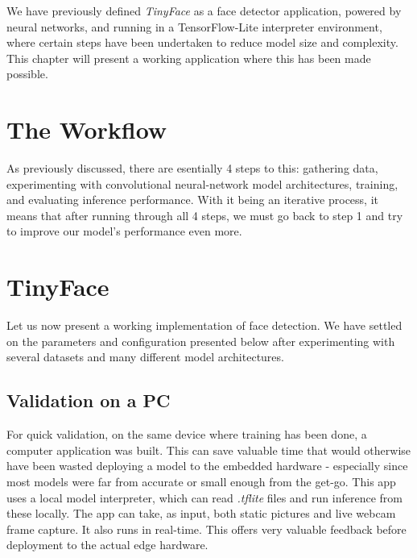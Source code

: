 We have previously defined \textit{TinyFace} as a face detector application, powered by neural networks, and running in a TensorFlow-Lite interpreter environment, where certain steps have been undertaken to reduce model size and complexity. This chapter will present a working application where this has been made possible.
\section{The Workflow}
As previously discussed, there are esentially 4 steps to this: gathering data, experimenting with convolutional neural-network model architectures, training, and evaluating inference performance. With it being an iterative process, it means that after running through all 4 steps, we must go back to step 1 and try to improve our model's performance even more. \par

\section{TinyFace}
Let us now present a working implementation of face detection. We have settled on the parameters and configuration presented below after experimenting with several datasets and many different model architectures. 

\subsection{Validation on a PC}
For quick validation, on the same device where training has been done, a computer application was built. This can save valuable time that would otherwise have been wasted deploying a model to the embedded hardware - especially since most models were far from accurate or small enough from the get-go. This app uses a local model interpreter, which can read \textit{.tflite} files and run inference from these locally. The app can take, as input, both static pictures and live webcam frame capture. It also runs in real-time. This offers very valuable feedback before deployment to the actual edge hardware.

